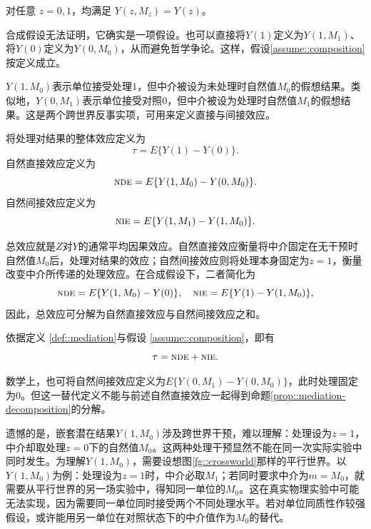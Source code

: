 \begin{assumption}
[合成假设]\label{assume::composition}
对任意 $z=0,1$，均满足 $Y(z, M_z) =   Y(z)$。 
\end{assumption}


合成假设无法证明，它确实是一项假设。也可以直接将$Y(1)$定义为$Y(1, M_1)$、将$ Y(0)$定义为$Y(0, M_0) $，从而避免哲学争论。这样，假设\ref{assume::composition}按定义成立。 



$Y(1,M_0)$表示单位接受处理$1$，但中介被设为未处理时自然值$M_0$的假想结果。类似地，$Y(0,M_1)$表示单位接受对照$0$，但中介被设为处理时自然值$M_1$的假想结果。这是两个跨世界反事实项，可用来定义直接与间接效应。 


\begin{definition}
\label{def::mediation}
将处理对结果的整体效应定义为
$$
\tau = E\{ Y(1)  - Y(0) \}.
$$
自然直接效应定义为
$$
\textsc{nde} = E\{  Y(1,M_0) - Y(0, M_0)  \}. 
$$
自然间接效应定义为 
$$
\textsc{nie} = E\{  Y(1, M_1) - Y(1, M_0) \} .
$$
\end{definition}


总效应就是$Z$对$Y$的通常平均因果效应。自然直接效应衡量将中介固定在无干预时自然值$M_0$后，处理对结果的效应；自然间接效应则将处理本身固定为$z=1$，衡量改变中介所传递的处理效应。在合成假设下，二者简化为
$$
\textsc{nde} = E\{  Y(1,M_0) - Y(0)  \} ,\quad
\textsc{nie} = E\{  Y(1) - Y(1, M_0) \},
$$
因此，总效应可分解为自然直接效应与自然间接效应之和。


\begin{proposition}
\label{prop::mediation-decomposition}
依据定义 \ref{def::mediation}与假设 \ref{assume::composition}，即有
$$
\tau = \textsc{nde} + \textsc{nie} .
$$
\end{proposition}

数学上，也可将自然间接效应定义为$ E\{  Y(0, M_1) - Y(0, M_0) \}$，此时处理固定为$0$。但这一替代定义不能与前述自然直接效应一起得到命题\ref{prop::mediation-decomposition}的分解。 

遗憾的是，嵌套潜在结果$Y(1,M_0)$涉及跨世界干预，难以理解：处理设为$z=1$，中介却取处理$z=0$下的自然值$M_0$。这两种处理干预显然不能在同一次实际实验中同时发生。为理解$Y(1,M_0)$，需要设想图\ref{fg::crossworld}那样的平行世界。以$Y(1,M_0)$为例：处理设为$z=1$时，中介必取$M_1$；若同时要求中介为$m=M_0$，就需要从平行世界的另一场实验中，得知同一单位的$M_0$。这在真实物理实验中可能无法实现，因为需要同一单位同时接受两个不同处理水平。若对单位同质性作较强假设，或许能用另一单位在对照状态下的中介值作为$M_0$的替代。 



